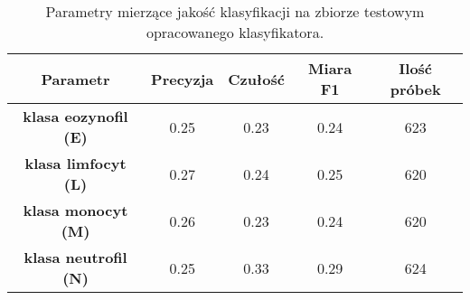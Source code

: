 {\begin{table}[h!]
\centering
\caption[Short Heading]{Parametry mierzące jakość klasyfikacji na zbiorze testowym opracowanego klasyfikatora.}
\label{tab:kaggle_1_params_val_1}
\begin{tabular}{|c|c|c|c|c|}
\hline
\textbf{Parametr}                               & \textbf{Precyzja} & \textbf{Czułość} & \textbf{Miara F1} & \textbf{Ilość próbek} \\ \hline
\textbf{klasa eozynofil (E)} & 0.25   & 0.23   & 0.24  & 623  \\ \hline
\textbf{klasa limfocyt (L)} & 0.27  & 0.24 & 0.25  & 620  \\ \hline
\textbf{klasa monocyt (M)} & 0.26   & 0.23    & 0.24  & 620  \\ \hline
\textbf{klasa neutrofil (N)} & 0.25   & 0.33   & 0.29  & 624  \\ \hline
\end{tabular}
\end{table}
}